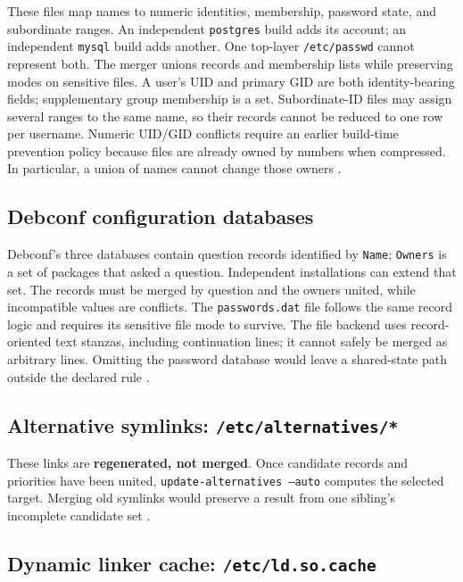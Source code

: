 These files map names to numeric identities, membership, password state, and subordinate ranges. An independent \texttt{postgres} build adds its account; an independent \texttt{mysql} build adds another. One top-layer \texttt{/etc/passwd} cannot represent both. The merger unions records and membership lists while preserving modes on sensitive files. A user's \ac{UID} and primary \ac{GID} are both identity-bearing fields; supplementary group membership is a set. Subordinate-ID files may assign several ranges to the same name, so their records cannot be reduced to one row per username. Numeric \ac{UID}/\ac{GID} conflicts require an earlier build-time prevention policy because files are already owned by numbers when compressed. In particular, a union of names cannot change those owners \autocite{debian-policy-users,man-adduser-conf,man-login-defs}.

\subsection{Debconf configuration databases}

Debconf's three databases contain question records identified by \texttt{Name}; \texttt{Owners} is a set of packages that asked a question. Independent installations can extend that set. The records must be merged by question and the owners united, while incompatible values are conflicts. The \texttt{passwords.dat} file follows the same record logic and requires its sensitive file mode to survive. The file backend uses record-oriented text stanzas, including continuation lines; it cannot safely be merged as arbitrary lines. Omitting the password database would leave a shared-state path outside the declared rule \autocite{man-debconf,man-debconf-devel}.

\subsection{Alternative symlinks: \texttt{/etc/alternatives/*}}

These links are \textbf{regenerated, not merged}. Once candidate records and priorities have been united, \texttt{update-alternatives --auto} computes the selected target. Merging old symlinks would preserve a result from one sibling's incomplete candidate set \autocite{man-update-alternatives}.

\subsection{Dynamic linker cache: \texttt{/etc/ld.so.cache}}

